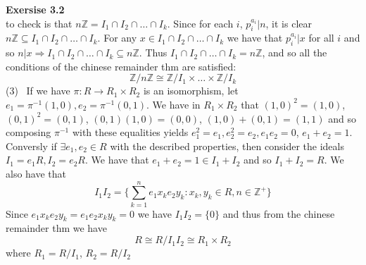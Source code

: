 \documentclass[12pt]{article}
\newenvironment{ques}[1]{\textbf{Exersise #1}\vspace{1 mm}\\ }{\bigskip}
\theoremstyle{definition}
\newcommand{\Z}{\mathbb Z}
\begin{document}
\begin{ques}{3.2}
	to check is that $n\Z = I_1\cap I_2 \cap\dots \cap I_k$. Since for each
	$i$, $p_i^{a_i}|n$, it is clear $n\Z \subseteq I_1\cap I_2 \cap\dots \cap
	I_k$. For any $x \in I_1\cap I_2 \cap\dots \cap I_k$ we have that
	$p_i^{a_i}|x$ for all $i$ and so $n|x \Rightarrow I_1\cap I_2 \cap\dots
	\cap I_k \subseteq n\Z$. Thus $I_1\cap I_2 \cap\dots \cap I_k = n\Z$, and so
	all the conditions of the chinese remainder thm are satisfied:
	$$\Z/n\Z \cong \Z/I_1 \times \dots \times \Z/I_k$$
	(3) \ If we have $\pi : R \to R_1 \times R_2$ is an isomorphism, let $e_1 =
	\pi^{-1}(1,0), e_2 = \pi^{-1}(0,1)$. We have in $ R_1
	\times R_2$ that $(1,0)^2 = (1,0)$, $(0,1)^2 = (0,1)$, $(0,1)(1,0) =
	(0,0)$, $(1,0) + (0,1) = (1,1)$ and so composing $\pi^{-1}$ with these
	equalities yields $e_1^2 = e_1, e_2^2 = e_2, e_1e_2 = 0$, $e_1 + e_2 = 1$.\\
	Conversly if $\exists e_1, e_2 \in R$ with the described properties, then
	consider the ideals $I_1 = e_1R, I_2 = e_2R$. We have that $e_1 + e_2 = 1
	\in I_1 + I_2$ and so $I_1 + I_2 = R$. We also have that 
	$$I_1I_2 = \{\sum_{k=1}^n e_1x_ke_2y_k: x_k,y_k \in R, n \in \Z^+\}$$
	Since $e_1x_ke_2y_k = e_1e_2x_ky_k = 0$ we have $I_1I_2 = \{0\}$ and thus from
	the chinese remainder thm we have
	$$R \cong R/I_1I_2 \cong R_1 \times R_2$$
	where $R_1 = R/I_1$, $R_2 = R/I_2$


\end{ques}
\end{document}
